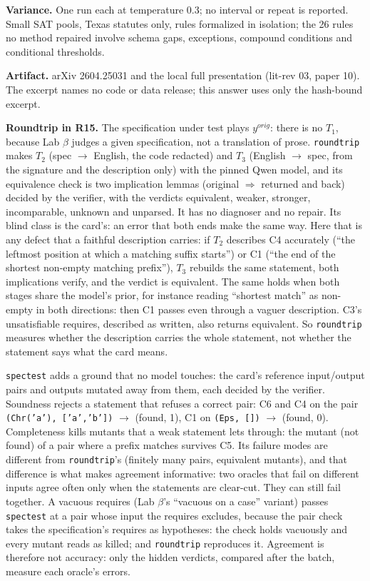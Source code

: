 \documentclass[11pt]{article}
\begin{document}
\begin{answer}
\textbf{Variance.} One run each at temperature 0.3; no interval or repeat is
reported. Small SAT pools, Texas statutes only, rules formalized in isolation;
the 26 rules no method repaired involve schema gaps, exceptions, compound
conditions and conditional thresholds.

\textbf{Artifact.} arXiv 2604.25031 and the local full presentation (lit-rev
03, paper 10). The excerpt names no code or data release; this answer uses only
the hash-bound excerpt.

\textbf{Roundtrip in R15.} The specification under test plays $y^{orig}$:
there is no $T_1$, because Lab $\beta$ judges a given specification, not a
translation of prose. \texttt{roundtrip} makes $T_2$ (spec $\to$ English, the
code redacted) and $T_3$ (English $\to$ spec, from the signature and the
description only) with the pinned Qwen model, and its equivalence check is two
implication lemmas (original $\Rightarrow$ returned and back) decided by the
verifier, with the verdicts equivalent, weaker, stronger, incomparable,
unknown and unparsed. It has no diagnoser and no repair. Its blind class is
the card's: an error that both ends make the same way. Here that is any defect
that a faithful description carries: if $T_2$ describes C4 accurately
(``the leftmost position at which a matching suffix starts'') or C1 (``the end of
the shortest non-empty matching prefix''), $T_3$ rebuilds the same statement,
both implications verify, and the verdict is equivalent. The same holds when
both stages share the model's prior, for instance reading ``shortest match''
as non-empty in both directions: then C1 passes even through a vaguer
description. C3's unsatisfiable requires, described as written, also returns
equivalent. So \texttt{roundtrip} measures whether the description carries the
whole statement, not whether the statement says what the card means.

\texttt{spectest} adds a ground that no model touches: the card's reference
input/output pairs and outputs mutated away from them, each decided by the
verifier. Soundness rejects a statement that refuses a correct pair: C6 and C4
on the pair \texttt{(Chr('a'), ['a','b'])} $\to$ (found, 1), C1 on
\texttt{(Eps, [])} $\to$ (found, 0). Completeness kills mutants that a weak
statement lets through: the mutant (not found) of a pair where a prefix
matches survives C5. Its failure modes are different from \texttt{roundtrip}'s
(finitely many pairs, equivalent mutants), and that difference is what makes
agreement informative: two oracles that fail on different inputs agree often
only when the statements are clear-cut. They can still fail together. A
vacuous requires (Lab $\beta$'s ``vacuous on a case'' variant) passes
\texttt{spectest} at a pair whose input the requires excludes, because the
pair check takes the specification's requires as hypotheses: the check holds
vacuously and every mutant reads as killed; and \texttt{roundtrip} reproduces
it. Agreement is therefore not accuracy: only the hidden verdicts, compared
after the batch, measure each oracle's errors.
\end{answer}
\end{document}
